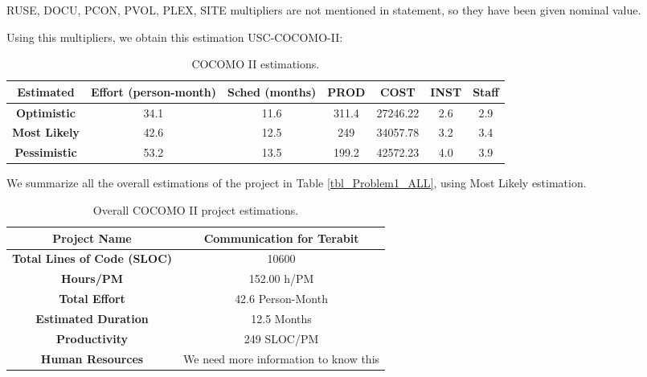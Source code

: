 RUSE, DOCU, PCON, PVOL, PLEX, SITE multipliers are not mentioned in statement, so they have been given nominal value.


Using this multipliers, we obtain this estimation USC-COCOMO-II:

\begin{table}[hbtp]
\begin{tabular}{|c||c|c|c|c|c|c|}
\hline
\textbf{Estimated} & \textbf{Effort (person-month)} & \textbf{Sched (months)} & \textbf{PROD} & \textbf{COST} & \textbf{INST} & \textbf{Staff} \\ \hline
\textbf{Optimistic} & 34.1 & 11.6 & 311.4 & 27246.22 & 2.6 & 2.9 \\
\textbf{Most Likely} & 42.6& 12.5 & 249 & 34057.78 & 3.2 & 3.4 \\
\textbf{Pessimistic} & 53.2 & 13.5 &199.2 & 42572.23 & 4.0 & 3.9\\ \hline
\end{tabular}
\label{tbl_Problem2}
\caption{COCOMO II estimations.}
\end{table}

We summarize all the overall estimations of the project in Table \ref{tbl_Problem1_ALL}, using Most Likely estimation.

\begin{table}[hbtp]
\begin{tabular}{|c|c|} \hline
\textbf{Project Name} & {Communication for Terabit} \\ \hline
\textbf{Total Lines of Code (SLOC)} & {10600} \\ \hline
\textbf{Hours/PM} & {152.00 h/PM} \\ \hline
\textbf{Total Effort} & {42.6 Person-Month} \\ \hline
\textbf{Estimated Duration} & {12.5 Months} \\ \hline
\textbf{Productivity} & {249 SLOC/PM} \\ \hline
\textbf{Human Resources} & We need more information to know this \\ \hline
\end{tabular}
\label{tbl_Problem2_ALL}
\caption{Overall COCOMO II project estimations.}
\end{table}
